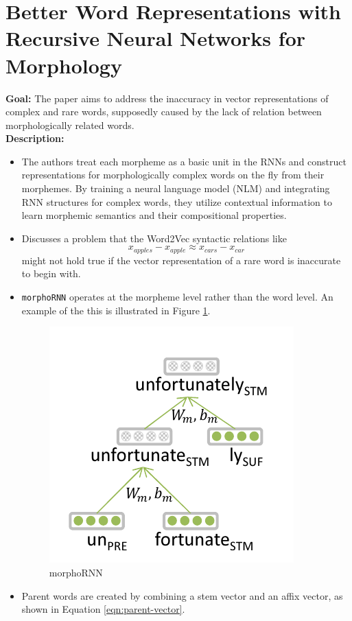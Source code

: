\documentclass[11pt,a4paper]{article}
\begin{document}


\section{Better Word Representations with Recursive Neural Networks for Morphology} %
\label{sec:better_word_representations_with_recursive_neural_networks_for_morphology}

  \textbf{Goal:}
  The paper aims to address the inaccuracy in vector representations of complex and rare words, supposedly caused by the lack of relation between morphologically related words. \cite{luong2013better}\\

  \textbf{Description:}
  \begin{itemize}
    \item
    The authors treat each morpheme as a basic unit in the RNNs and construct representations for morphologically complex words on the fly from their morphemes. By training a neural language model (NLM) and integrating RNN structures for complex words, they utilize contextual information to learn morphemic semantics and their compositional properties.
    \item
    Discusses a problem that the Word2Vec syntactic relations like $$x_{apples} - x_{apple} \approx x_{cars} - x_{car}$$ might not hold true if the vector representation of a rare word is inaccurate to begin with.
    \item
    \texttt{morphoRNN} operates at the morpheme level rather than the word level. An example of the this is illustrated in Figure \ref{fig:rnn-morphology}.
    \begin{figure}[ht]
      \centering
      \includegraphics[width=.4\textwidth]{rnn-morphology}
      \caption{morphoRNN}
      \label{fig:rnn-morphology}
    \end{figure}
    \item
    Parent words are created by combining a stem vector and an affix vector, as shown in Equation \ref{eqn:parent-vector}.

\end{itemize}
\end{document}
